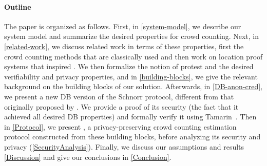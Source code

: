 \paragraph*{Outline}

The paper is organized as follows.
First, in \cref{system-model}, we describe our system model and summarize the desired properties for crowd counting. Next, in \cref{related-work}, we discuss related work in terms of these properties, first the crowd counting methods that are classically used and then work on location proof systems that inspired \CROCUS. 
We then formalize the notion of protest and the desired verifiability and privacy properties, and in \cref{building-blocks}, we give the relevant background on the building blocks of our solution. 
Afterwards, in \cref{DB-anon-cred}, we present a new \ac{DB} version of the Schnorr protocol, different from that originally proposed by \textcite{DistanceBounding}.
We provide a proof of its security (\ie the fact that it achieved all desired \ac{DB} properties) 
and formally verify it using Tamarin~\cite{TamarinDB}.
Then in \cref{Protocol}, we present \CROCUS, a privacy-preserving crowd 
counting estimation protocol constructed from these building blocks, before 
analyzing its security and privacy (\cref{SecurityAnalysis}).
Finally, we discuss our assumptions and results \cref{Discussion} and give our conclusions in \cref{Conclusion}.
